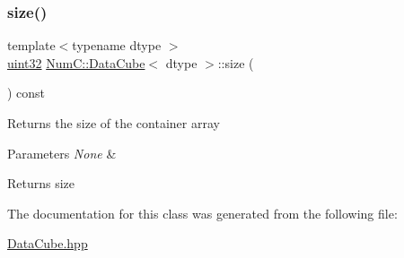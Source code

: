\subsubsection{\texorpdfstring{size()}{size()}}
{\footnotesize\ttfamily template$<$typename dtype $>$ \\
\mbox{\hyperlink{namespace_num_c_ae685802ca6d3035f2b400b081e3953fa}{uint32}} \mbox{\hyperlink{class_num_c_1_1_data_cube}{Num\+C\+::\+Data\+Cube}}$<$ dtype $>$\+::size (\begin{DoxyParamCaption}{ }\end{DoxyParamCaption}) const\hspace{0.3cm}{\ttfamily [inline]}}

Returns the size of the container array


\begin{DoxyParams}{Parameters}
{\em None} & \\
\hline
\end{DoxyParams}
\begin{DoxyReturn}{Returns}
size 
\end{DoxyReturn}


The documentation for this class was generated from the following file\+:\begin{DoxyCompactItemize}
\item 
\mbox{\hyperlink{_data_cube_8hpp}{Data\+Cube.\+hpp}}\end{DoxyCompactItemize}
